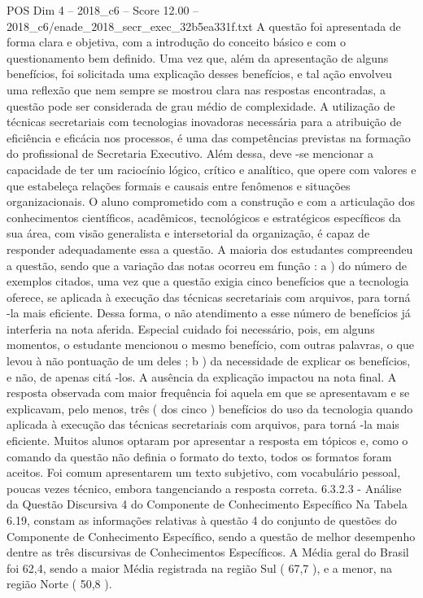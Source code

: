 \begin{textsample}{POS Dim 4 – 2018\_c6 – Score 12.00 – 2018\_c6/enade\_2018\_secr\_exec\_32b5ea331f.txt}
A questão foi apresentada de forma clara e objetiva, com a introdução do conceito básico e com o questionamento bem definido.
Uma vez que, além da apresentação de alguns benefícios, foi solicitada uma explicação desses benefícios, e tal ação envolveu uma reflexão que nem sempre se mostrou clara nas respostas encontradas, a questão pode ser considerada de grau médio de complexidade.
A utilização de técnicas secretariais com tecnologias inovadoras necessária para a atribuição de eficiência e eficácia nos processos, é uma das competências previstas na formação do profissional de Secretaria Executivo.
Além dessa, deve -se mencionar a capacidade de ter um raciocínio lógico, crítico e analítico, que opere com valores e que estabeleça relações formais e causais entre fenômenos e situações organizacionais.
O aluno comprometido com a construção e com a articulação dos conhecimentos científicos, acadêmicos, tecnológicos e estratégicos específicos da sua área, com visão generalista e intersetorial da organização, é capaz de responder adequadamente essa a questão.
A maioria dos estudantes compreendeu a questão, sendo que a variação das notas ocorreu em função : a ) do número de exemplos citados, uma vez que a questão exigia cinco benefícios que a tecnologia oferece, se aplicada à execução das técnicas secretariais com arquivos, para torná -la mais eficiente.
Dessa forma, o não atendimento a esse número de benefícios já interferia na nota aferida.
Especial cuidado foi necessário, pois, em alguns momentos, o estudante mencionou o mesmo benefício, com outras palavras, o que levou à não pontuação de um deles ; b ) da necessidade de explicar os benefícios, e não, de apenas citá -los.
A ausência da explicação impactou na nota final.
A resposta observada com maior frequência foi aquela em que se apresentavam e se explicavam, pelo menos, três ( dos cinco ) benefícios do uso da tecnologia quando aplicada à execução das técnicas secretariais com arquivos, para torná -la mais eficiente.
Muitos alunos optaram por apresentar a resposta em tópicos e, como o comando da questão não definia o formato do texto, todos os formatos foram aceitos.
Foi comum apresentarem um texto subjetivo, com vocabulário pessoal, poucas vezes técnico, embora tangenciando a resposta correta. 6.3.2.3 - Análise da Questão Discursiva 4 do Componente de Conhecimento Específico Na Tabela 6.19, constam as informações relativas à questão 4 do conjunto de questões do Componente de Conhecimento Específico, sendo a questão de melhor desempenho dentre as três discursivas de Conhecimentos Específicos.
A Média geral do Brasil foi 62,4, sendo a maior Média registrada na região Sul ( 67,7 ), e a menor, na região Norte ( 50,8 ).

\end{textsample}
